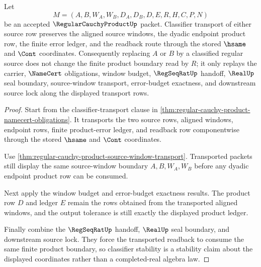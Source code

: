 \begin{theorem}
\label{thm:regular-cauchy-product-classifier-stability}
Let
$$
M=(A,B,W_A,W_B,D_A,D_B,D,E,R,H,C,P,N)
$$
be an accepted $\RegularCauchyProductUp$ packet. Classifier transport of either source row preserves the aligned source windows, the dyadic endpoint product row, the finite error ledger, and the readback route through the stored $\hsame$ and $\Cont$ coordinates. Consequently replacing $A$ or $B$ by a classified regular source does not change the finite product boundary read by $R$; it only replays the carrier, $\NameCert$ obligations, window budget, $\RegSeqRatUp$ handoff, $\RealUp$ seal boundary, source-window transport, error-budget exactness, and downstream source lock along the displayed transport rows.
\end{theorem}
\begin{proof}
Start from the classifier-transport clause in \autoref{thm:regular-cauchy-product-namecert-obligations}. It transports the two source rows, aligned windows, endpoint rows, finite product-error ledger, and readback row componentwise through the stored $\hsame$ and $\Cont$ coordinates.

Use \autoref{thm:regular-cauchy-product-source-window-transport}. Transported packets still display the same source-window boundary $A,B,W_A,W_B$ before any dyadic endpoint product row can be consumed.

Next apply the window budget and error-budget exactness results. The product row $D$ and ledger $E$ remain the rows obtained from the transported aligned windows, and the output tolerance is still exactly the displayed product ledger.

Finally combine the $\RegSeqRatUp$ handoff, $\RealUp$ seal boundary, and downstream source lock. They force the transported readback to consume the same finite product boundary, so classifier stability is a stability claim about the displayed coordinates rather than a completed-real algebra law.
\end{proof}

